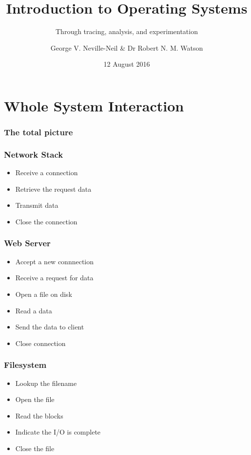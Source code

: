 
\usepackage[english]{babel}
\usepackage[latin1]{inputenc}
\usepackage{graphicx}
\usepackage{times}
\usepackage[T1]{fontenc}
\usepackage{fancyvrb}
\usepackage{listings}


\title{Introduction to Operating Systems}
\subtitle{Through tracing, analysis, and experimentation}
\author{George V. Neville-Neil \& Dr Robert N. M. Watson}
\date{12 August 2016}

\begin{frame}
  \titlepage
\end{frame}

\section{Whole System Interaction}
\label{sec:whole}

\begin{frame}
  \frametitle{The total picture}
\end{frame}

\begin{frame}
  \frametitle{Network Stack}
  \begin{itemize}
  \item Receive a connection
  \item Retrieve the request data
  \item Transmit data
  \item Close the connection
  \end{itemize}
\end{frame}

\begin{frame}
  \frametitle{Web Server}
  \begin{itemize}
  \item Accept a new connnection
  \item Receive a request for data
  \item Open a file on disk
  \item Read a data
  \item Send the data to client
  \item Close connection
  \end{itemize}
\end{frame}

\begin{frame}
  \frametitle{Filesystem}
  \begin{itemize}
  \item Lookup the filename
  \item Open the file
  \item Read the blocks 
  \item Indicate the I/O is complete
  \item Close the file
  \end{itemize}
\end{frame}


